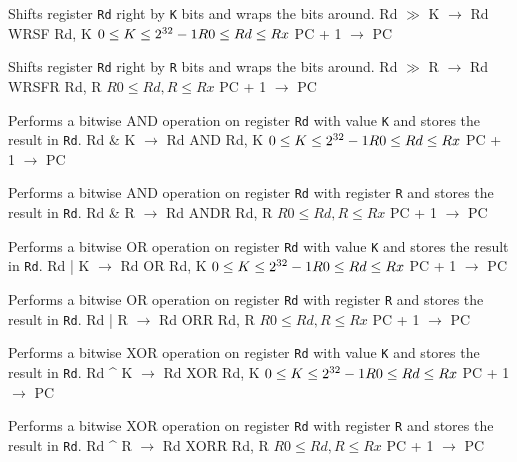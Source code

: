 \documentclass[titlepage]{scrartcl}
\begin{document}
{Shifts register \texttt{Rd} right by \texttt{K} bits and wraps the bits around.}
{Rd $\gg$ K $\rightarrow$ Rd}
{WRSF Rd, K}
{$0 \leq K \leq 2^{32} - 1 \hfill \break R0 \leq Rd \leq Rx$}
{PC + 1 $\rightarrow$ PC}
{}
{}

{Shifts register \texttt{Rd} right by \texttt{R} bits and wraps the bits around.}
{Rd $\gg$ R $\rightarrow$ Rd}
{WRSFR Rd, R}
{$R0 \leq Rd, R \leq Rx$}
{PC + 1 $\rightarrow$ PC}
{}
{}

{Performs a bitwise AND operation on register \texttt{Rd} with value \texttt{K} and stores the result in \texttt{Rd}.}
{Rd \& K $\rightarrow$ Rd}
{AND Rd, K}
{$0 \leq K \leq 2^{32} - 1 \hfill \break R0 \leq Rd \leq Rx$}
{PC + 1 $\rightarrow$ PC}
{}
{}

{Performs a bitwise AND operation on register \texttt{Rd} with register \texttt{R} and stores the result in \texttt{Rd}.}
{Rd \& R $\rightarrow$ Rd}
{ANDR Rd, R}
{$R0 \leq Rd, R \leq Rx$}
{PC + 1 $\rightarrow$ PC}
{}
{}

{Performs a bitwise OR operation on register \texttt{Rd} with value \texttt{K} and stores the result in \texttt{Rd}.}
{Rd | K $\rightarrow$ Rd}
{OR Rd, K}
{$0 \leq K \leq 2^{32} - 1 \hfill \break R0 \leq Rd \leq Rx$}
{PC + 1 $\rightarrow$ PC}
{}
{}

{Performs a bitwise OR operation on register \texttt{Rd} with register \texttt{R} and stores the result in \texttt{Rd}.}
{Rd | R $\rightarrow$ Rd}
{ORR Rd, R}
{$R0 \leq Rd, R \leq Rx$}
{PC + 1 $\rightarrow$ PC}
{}
{}

{Performs a bitwise XOR operation on register \texttt{Rd} with value \texttt{K} and stores the result in \texttt{Rd}.}
{Rd \string^ K $\rightarrow$ Rd}
{XOR Rd, K}
{$0 \leq K \leq 2^{32} - 1 \hfill \break R0 \leq Rd \leq Rx$}
{PC + 1 $\rightarrow$ PC}
{}
{}

{Performs a bitwise XOR operation on register \texttt{Rd} with register \texttt{R} and stores the result in \texttt{Rd}.}
{Rd \string^ R $\rightarrow$ Rd}
{XORR Rd, R}
{$R0 \leq Rd, R \leq Rx$}
{PC + 1 $\rightarrow$ PC}
{}
{}
\end{document}
